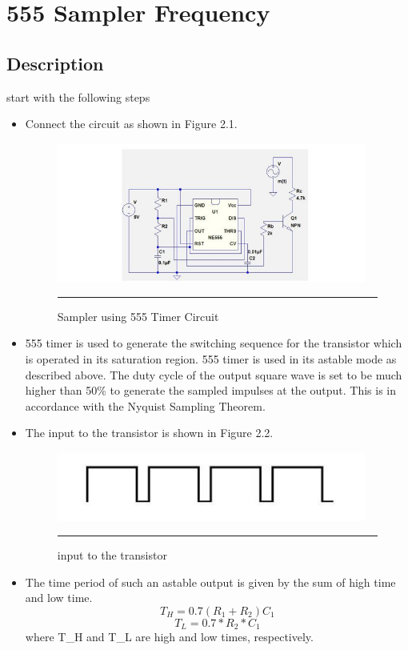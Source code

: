 
\chapter{555 Sampler Frequency } %
\label{Chapter2}
\section{Description}
start with the following steps
\begin{itemize}
    \item Connect the circuit as shown in Figure 2.1.
    \begin{figure}[htbp]
	    \centering
	    \includegraphics[width = 4in]{./Figures/sampler.jpg}
	    \rule{35em}{0.5pt}
	    \caption{Sampler using 555 Timer Circuit}
    \end{figure}
\end{itemize}
\begin{itemize}
    \item 555 timer is used to generate the switching sequence for the transistor which is operated in its saturation region. 555 timer is used in its astable mode as described above. The duty cycle of the output square wave is set to be much higher than 50\% to generate the sampled impulses at the output. This is in accordance with the Nyquist Sampling Theorem.

    \item The input to the transistor is shown in Figure 2.2.     
    \begin{figure}[htbp]
	    \centering
	    \includegraphics[width = 4in]{./Figures/input.jpg}
	    \rule{35em}{0.5pt}
	    \caption{input to the transistor}
    \end{figure}

    \item The time period of such an astable output is given by the sum of high time and low time. 
        \[T_H=0.7(R_1 + R_2) C_1\] 
        \[T_L=0.7*R_2*C_1\] 
    where T_H and T_L are high and low times, respectively.
\end{itemize}
